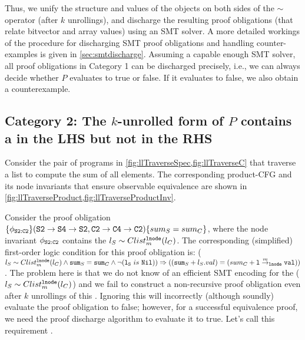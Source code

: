 Thus, we unify the structure and
values of the \SpecL{} objects on both sides of
the $\sim$ operator (after $k$ unrollings), and discharge the resulting
proof obligations (that relate bitvector and array values) using an SMT solver.
A more detailed workings of the procedure for discharging SMT proof obligations and handling counter-examples is given
in \cref{sec:smtdischarge}.
Assuming a capable enough SMT solver,
all proof obligations in Category 1 can be discharged precisely, i.e.,
we can always decide whether $P$ evaluates to true or false. If it
evaluates to false, we also obtain a counterexample.



\subsection{Category 2: The $k$-unrolled form of $P$
contains a \recursiveRelation{} in the LHS but not in the RHS}
\label{sec:cat2}

Consider the pair of programs in \cref{fig:llTraverseSpec,fig:llTraverseC}
that traverse a list to compute the sum of all elements.
The corresponding product-CFG and its node
invariants that ensure observable
equivalence are shown in \cref{fig:llTraverseProduct,fig:llTraverseProductInv}.

Consider
the proof obligation $\{\phi_{{\tt S2:C2}}\} ({\tt S2\rightarrow S4\rightarrow S2}, {\tt C2\rightarrow C4\rightarrow C2}) \{sum_{S} = sum_{C}\}$, where
the node invariant $\phi_{{\tt S2:C2}}$ contains
the \recursiveRelation{} $l_{S}\sim{}Clist^{{\tt lnode}}_{m}(l_{C})$.
The corresponding (simplified) first-order logic condition for this
proof obligation is:
($l_{S}\sim{}Clist^{{\tt lnode}}_{m}(l_{C}) \land {\tt sum}_S={\tt sum}_C \land \neg({\tt l_S}\ is\ {\tt Nil})) \Rightarrow (({\tt sum}_S + l_S.val) = (sum_C + {\tt l} \overset{m}{\rightarrow}_{{\tt lnode}} {\tt val}))$.
The problem here is that we do not know of an efficient
SMT encoding for the \recursiveRelation{} ($l_{S}\sim{}Clist^{{\tt lnode}}_{m}(l_{C})$)
and we fail to construct a non-recursive proof obligation even
after $k$ unrollings of this \recursiveRelation{}.
Ignoring this \recursiveRelation{} will incorrectly (although soundly) evaluate
the proof obligation to false; however, for a successful equivalence
proof, we need
the proof discharge algorithm to evaluate it to true. Let's call this
requirement .

